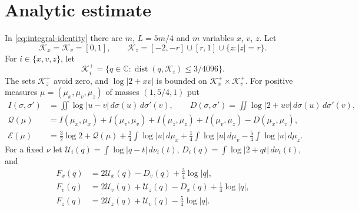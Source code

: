 \documentclass{amsart}
\numberwithin{equation}{section}
\numberwithin{table}{section}
\begin{document}
\section{Analytic estimate}\label{sec:analytic}

In \eqref{eq:integral-identity} there are $m$, $L=5m/4$ and $m$ variables
$x$, $v$, $z$. Let
\[
 \mathcal K_x=\mathcal K_v=[0,1],\qquad
 \mathcal K_z=[-2,-r]\cup[r,1]\cup\{z:|z|=r\}.
\]
For $i\in\{x,v,z\}$, let
\[
 \mathcal K_i^+=\{q\in\mathbb C:\operatorname{dist}(q,\mathcal K_i)\le3/4096\}.
\]
The sets $\mathcal K_z^+$ avoid zero, and $\log|2+xv|$ is bounded on
$\mathcal K_x^+\times\mathcal K_v^+$.
For positive measures $\mu=(\mu_x,\mu_v,\mu_z)$ of masses $(1,5/4,1)$ put
\begin{align*}
 I(\sigma,\sigma')&=\iint\log|u-v|\,d\sigma(u)\,d\sigma'(v),\qquad
 D(\sigma,\sigma')=\iint\log|2+uv|\,d\sigma(u)\,d\sigma'(v),\\
 \mathcal Q(\mu)&=I(\mu_x,\mu_x)+I(\mu_v,\mu_v)+I(\mu_z,\mu_z)
                +I(\mu_v,\mu_z)-D(\mu_x,\mu_v),
\\
 \mathcal E(\mu)&=\frac32\log2+\mathcal Q(\mu)
 +\frac34\int\log|u|\,d\mu_x
 +\frac14\int\log|u|\,d\mu_v
 -\frac54\int\log|u|\,d\mu_z.
\end{align*}
For a fixed $\nu$ let
$\mathcal U_i(q)=\int\log|q-t|\,d\nu_i(t)$,
$D_i(q)=\int\log|2+qt|\,d\nu_i(t)$, and
\begin{align*}
 F_x(q)&=2\mathcal U_x(q)-D_v(q)+\tfrac34\log|q|,\\
 F_v(q)&=2\mathcal U_v(q)+\mathcal U_z(q)-D_x(q)+\tfrac14\log|q|,
\\
 F_z(q)&=2\mathcal U_z(q)+\mathcal U_v(q)-\tfrac54\log|q|.
\end{align*}
\end{document}
